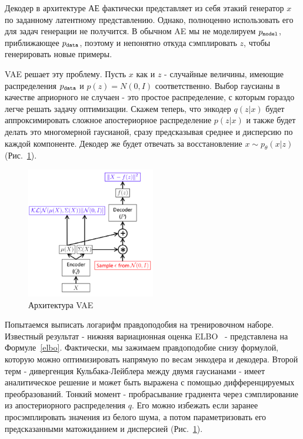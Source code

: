 \documentclass{spbau-diploma}
\begin{document}
Декодер в архитектуре АЕ фактически представляет из себя этакий генератор $x$
по заданному латентному представлению. Однако, полноценно использовать его для
задач генерации не получится. В обычном AE мы не моделируем $p_{\texttt{model}}$, 
приближающее $p_{\texttt{data}}$, поэтому и непонятно откуда сэмплировать $z$, чтобы 
генерировать новые примеры. 

VAE решает эту проблему. Пусть $x$ как и $z$ - случайные величины, имеющие
распределения $p_{\texttt{data}}$ и $p(z) = N(0, I)$ соответственно. Выбор гаусианы в 
качестве априорного не случаен - это простое распределение, с которым гораздо 
легче решать задачу оптимизации. 
Скажем теперь, что энкодер $q(z|x)$ будет аппроксимировать сложное 
апостериорное распределение $p(z|x)$ и также будет делать это многомерной
гаусианой, сразу предсказывая среднее и дисперсию по каждой компоненте. Декодер
же будет отвечать за восстановление $x \sim p_{\theta}(x|z)$ 
(Рис.~\ref{vae_terms}). 

\begin{figure}[H]
\centering
\includegraphics[width=0.5\textwidth]{images/vae_terms.png}
\caption{Архитектура VAE~\cite{habr:vae}}
\label{vae_terms}
\end{figure}

Попытаемся выписать логарифм правдоподобия на тренировочном наборе. Известный 
результат - нижняя вариационная оценка ELBO~\cite{vae} - представлена на 
Формуле~\ref{elbo}. Фактически, мы зажимаем правдоподобие снизу формулой, 
которую можно оптимизировать напрямую по весам энкодера и декодера. 
Второй терм - дивергенция Кульбака-Лейблера между двумя гаусианами - имеет 
аналитическое решение и может быть выражена с помощью дифференцируемых 
преобразований. 
Тонкий момент - пробрасывание градиента через сэмплирование из апостериорного 
распределения $q$. Его можно избежать если заранее просэмплировать значения из
белого шума, а потом параметризовать его предсказанными матожиданием и 
дисперсией (Рис.~\ref{vae_terms}).
\end{document}
